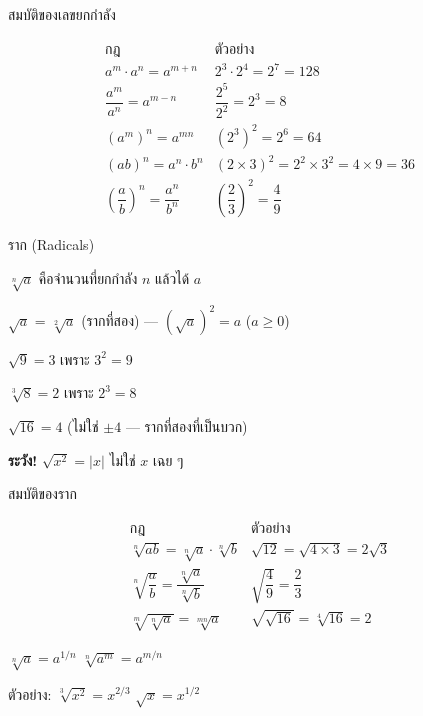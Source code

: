 \documentclass[11pt, aspectratio=169]{beamer}
\begin{document}
\begin{frame}{สมบัติของเลขยกกำลัง}
  \begin{explanation}[กฎของเลขยกกำลัง]
    \[
    \begin{array}{c|c}
      \textbf{กฎ} & \textbf{ตัวอย่าง} \\
      \hline
      a^m \cdot a^n = a^{m+n}         & 2^3 \cdot 2^4 = 2^7 = 128 \\[0.4em]
      \dfrac{a^m}{a^n} = a^{m-n}     & \dfrac{2^5}{2^2} = 2^3 = 8 \\[0.4em]
      (a^m)^n = a^{mn}               & (2^3)^2 = 2^6 = 64 \\[0.4em]
      (ab)^n = a^n \cdot b^n         & (2 \times 3)^2 = 2^2 \times 3^2 = 4 \times 9 = 36 \\[0.4em]
      \left(\dfrac{a}{b}\right)^n = \dfrac{a^n}{b^n} & \left(\dfrac{2}{3}\right)^2 = \dfrac{4}{9}
    \end{array}
    \]
  \end{explanation}
\end{frame}

\begin{frame}{ราก (Radicals)}
  \begin{explanation}[นิยาม]
    $\sqrt[n]{a}$ คือจำนวนที่ยกกำลัง $n$ แล้วได้ $a$

    \medskip
    $\sqrt{a}$ = $\sqrt[2]{a}$ (รากที่สอง) \quad — \quad $(\sqrt{a})^2 = a$ \; ($a \geq 0$)
  \end{explanation}

  \begin{exambox}[ตัวอย่าง]
    $\sqrt{9} = 3$ \quad เพราะ $3^2 = 9$

    $\sqrt[3]{8} = 2$ \quad เพราะ $2^3 = 8$

    $\sqrt{16} = 4$ \quad (ไม่ใช่ $\pm 4$ — รากที่สองที่เป็นบวก)

    \medskip
    \textbf{ระวัง!} $\sqrt{x^2} = |x|$ ไม่ใช่ $x$ เฉย ๆ
  \end{exambox}
\end{frame}

\begin{frame}{สมบัติของราก}
  \begin{explanation}[กฎของราก]
    \[
    \begin{array}{c|c}
      \textbf{กฎ} & \textbf{ตัวอย่าง} \\
      \hline
      \sqrt[n]{ab} = \sqrt[n]{a} \cdot \sqrt[n]{b} & \sqrt{12} = \sqrt{4 \times 3} = 2\sqrt{3} \\[0.4em]
      \sqrt[n]{\dfrac{a}{b}} = \dfrac{\sqrt[n]{a}}{\sqrt[n]{b}} & \sqrt{\dfrac{4}{9}} = \dfrac{2}{3} \\[0.4em]
      \sqrt[m]{\sqrt[n]{a}} = \sqrt[mn]{a} & \sqrt{\sqrt{16}} = \sqrt[4]{16} = 2
    \end{array}
    \]
  \end{explanation}

  \begin{exambox}
    $\sqrt[n]{a} = a^{1/n}$ \qquad $\sqrt[n]{a^m} = a^{m/n}$

    \medskip
    ตัวอย่าง: $\sqrt[3]{x^2} = x^{2/3}$ \qquad $\sqrt{x} = x^{1/2}$
  \end{exambox}
\end{frame}
\end{document}
